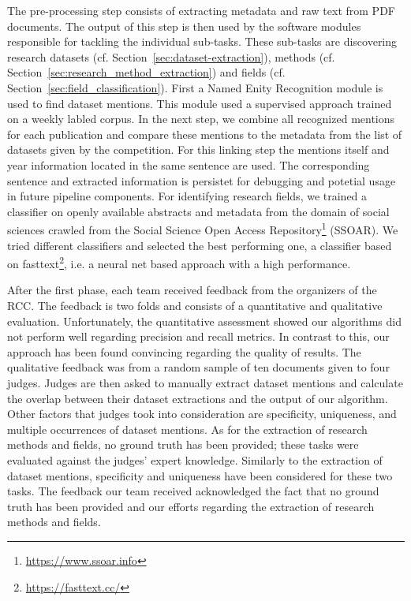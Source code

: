 The pre-processing step consists of extracting metadata and raw text from PDF documents.
The output of this step is then used by the software modules responsible for tackling the individual sub-tasks.
These sub-tasks are discovering research datasets (cf. Section~\ref{sec:dataset-extraction}), methods (cf. Section~\ref{sec:research_method_extraction}) and fields (cf. Section~\ref{sec:field_classification}).
First a Named Enity Recognition module is used to find dataset mentions.
This module used a supervised approach trained on a weekly labled corpus.
In the next step, we combine all recognized mentions for each publication and compare these mentions to the metadata from the list of datasets given by the competition. %
For this linking step the mentions itself and year information located in the same sentence are used.
The corresponding sentence and extracted information is persistet for debugging and potetial usage in future pipeline components.
For identifying research fields, we trained a classifier on openly available abstracts and metadata from the domain of social sciences crawled from the Social Science Open Access Repository\footnote{\url{https://www.ssoar.info}} (SSOAR).
We tried different classifiers and selected the best performing one, a classifier based on fasttext\footnote{\url{https://fasttext.cc/}}, i.e. a neural net based approach with a high performance\cite{joulin2017bag}.



After the first phase, each team received feedback from the organizers of the RCC.
The feedback is two folds and consists of a quantitative and qualitative evaluation. Unfortunately, the quantitative assessment showed our algorithms did not perform well regarding precision and recall metrics. In contrast to this, our approach has been found convincing regarding the quality of results. The qualitative feedback was from a random sample of ten documents given to four judges.
Judges are then asked to manually extract dataset mentions and calculate the overlap between their dataset extractions and the output of our algorithm.
Other factors that judges took into consideration are specificity, uniqueness, and multiple occurrences of dataset mentions.
As for the extraction of research methods and fields, no ground truth has been provided; these tasks were evaluated against the judges' expert knowledge.
Similarly to the extraction of dataset mentions, specificity and uniqueness have been considered for these two tasks.
The feedback our team received acknowledged the fact that no ground truth has been provided and our efforts regarding the extraction of research methods and fields.

